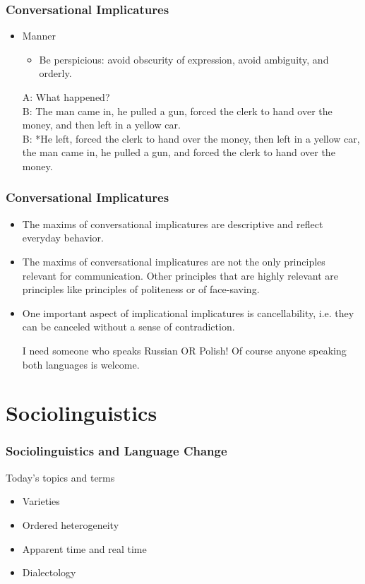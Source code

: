 \documentclass[12pt, table]{beamer}
\begin{document}
\begin{frame}
\frametitle{Conversational Implicatures}
\begin{itemize}
\item Manner
\begin{itemize}
\item Be perspicious: avoid obscurity of expression, avoid ambiguity, and orderly.
\end{itemize}
\begin{exe}
\ex A: What happened?\\
B: The man came in, he pulled a gun, forced the clerk to hand over the money, and then left in a yellow car.\\
B: *He left, forced the clerk to hand over the money, then left in a yellow car, the man came in, he pulled a gun, and forced the clerk to hand over the money.
\end{exe} 
\end{itemize}
\end{frame}

\begin{frame}
\frametitle{Conversational Implicatures}
\begin{itemize}
\item The maxims of conversational implicatures are  descriptive and reflect everyday behavior. 
\item The maxims of conversational implicatures are not the only principles relevant for communication. Other principles that are highly relevant are principles like principles of politeness or of face-saving.
\item One important aspect of implicational implicatures is cancellability, i.e. they can be canceled without a sense of contradiction.
\begin{exe}
\ex I need someone who speaks Russian OR Polish!
\ex Of course anyone speaking both languages is welcome.
\end{exe}
\end{itemize}
\end{frame}

\section{Sociolinguistics}
\begin{frame}
\frametitle{Sociolinguistics and Language Change}
Today's topics and terms
\begin{itemize}
\item Varieties
\item Ordered heterogeneity
\item Apparent time and real time
\item Dialectology
\end{itemize}
\end{frame}
\end{document}
